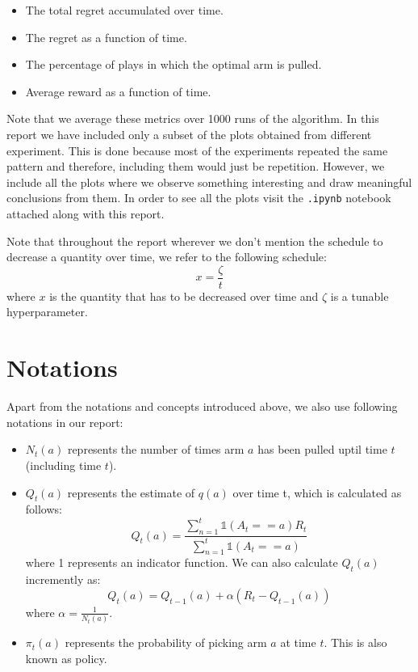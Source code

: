 \documentclass{article}
\begin{document}
	\begin{itemize}
		\item The total regret accumulated over time.
		\item The regret as a function of time.
		\item The percentage of plays in which the optimal arm is pulled.
		\item Average reward as a function of time.
	\end{itemize}
	
	Note that we average these metrics over 1000 runs of the algorithm. In this report we have included only a subset of the plots obtained from different experiment.
	This is done because most of the experiments repeated the same pattern and therefore, including them would just be repetition. However, we include all the plots
	where we observe something interesting and draw meaningful conclusions from them. In order to see all the plots visit the \verb|.ipynb| notebook attached along
	with this report. \par
	
	\noindent %
	Note that throughout the report wherever we don't mention the schedule to decrease a quantity over time, we refer to the following schedule:
	\begin{equation}
		x = \frac{\zeta}{t}
	\label{default_schedule}
	\end{equation}
	where $x$ is the quantity that has to be decreased over time and $\zeta$ is a tunable hyperparameter.
	
\section{Notations}
	Apart from the notations and concepts introduced above, we also use following notations in our report:
	\begin{itemize}
		\item $N_{t}(a)$ represents the number of times arm $a$ has been pulled uptil time $t$ (including time $t$).
		
		\item $Q_{t}(a)$ represents the estimate of $q(a)$ over time t, which is calculated as follows:
				\begin{equation}
				\nonumber
					Q_{t}(a) = \frac{\sum_{n=1}^{t} \mathbb{1}(A_{t} == a) R_{t}}{\sum_{n=1}^{t} \mathbb{1}(A_{t} == a)}
				\end{equation}
				where 1 represents an indicator function. We can also calculate $Q_{t}(a)$ incremently as:
				\begin{equation}
				\nonumber
					Q_{t}(a) = Q_{t-1}(a) + \alpha (R_{t} - Q_{t-1}(a))
				\end{equation}
				where $\alpha = \frac{1}{N_{t}(a)}$.
				
		\item $\pi_{t}(a)$ represents the probability of picking arm $a$ at time $t$. This is also known as policy.
	\end{itemize}
\end{document}
